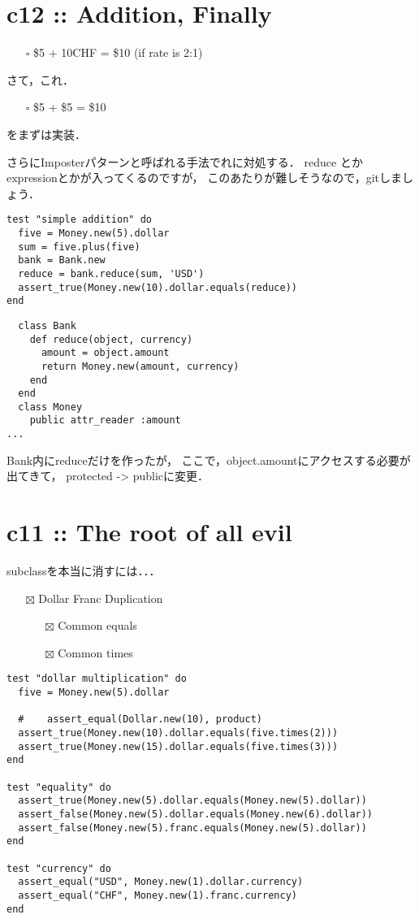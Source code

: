 \documentclass[11pt]{article}
\begin{document}
\section{c12 :: Addition, Finally}
\label{sec:orgba252d1}
\begin{itemize}
\item[{$\square$}] \$5 + 10CHF = \$10 (if rate is 2:1)
\end{itemize}
さて，これ．
\begin{itemize}
\item[{$\square$}] \$5 + \$5 = \$10
\end{itemize}
をまずは実装．

さらにImposterパターンと呼ばれる手法でれに対処する．
reduce とか expressionとかが入ってくるのですが，
このあたりが難しそうなので，gitしましょう．

\begin{verbatim}
test "simple addition" do
  five = Money.new(5).dollar
  sum = five.plus(five)
  bank = Bank.new
  reduce = bank.reduce(sum, 'USD')
  assert_true(Money.new(10).dollar.equals(reduce))
end
\end{verbatim}

\begin{verbatim}
  class Bank
    def reduce(object, currency)
      amount = object.amount
      return Money.new(amount, currency)
    end
  end
  class Money
    public attr_reader :amount
...
\end{verbatim}
Bank内にreduceだけを作ったが，
ここで，object.amountにアクセスする必要が出てきて，
protected -> publicに変更．
\section{c11 :: The root of all evil}
\label{sec:org44852f8}
subclassを本当に消すには．．．

\begin{itemize}
\item[{$\boxtimes$}] Dollar Franc Duplication
\begin{itemize}
\item[{$\boxtimes$}] Common equals
\item[{$\boxtimes$}] Common times
\end{itemize}
\end{itemize}
\begin{verbatim}
test "dollar multiplication" do
  five = Money.new(5).dollar

  #    assert_equal(Dollar.new(10), product)
  assert_true(Money.new(10).dollar.equals(five.times(2)))
  assert_true(Money.new(15).dollar.equals(five.times(3)))
end

test "equality" do
  assert_true(Money.new(5).dollar.equals(Money.new(5).dollar))
  assert_false(Money.new(5).dollar.equals(Money.new(6).dollar))
  assert_false(Money.new(5).franc.equals(Money.new(5).dollar))
end

test "currency" do
  assert_equal("USD", Money.new(1).dollar.currency)
  assert_equal("CHF", Money.new(1).franc.currency)
end
\end{verbatim}
\end{document}
